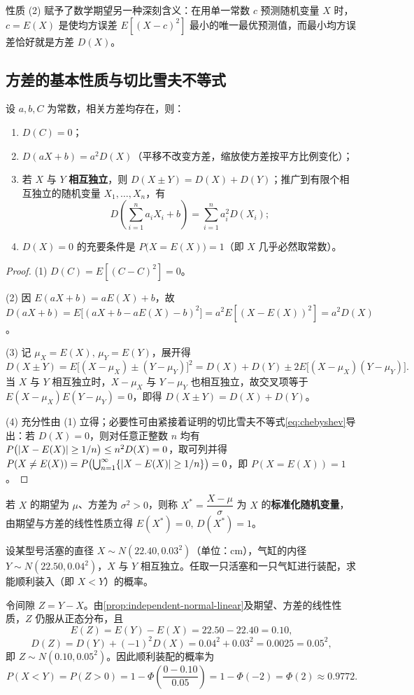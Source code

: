 性质 (2) 赋予了数学期望另一种深刻含义：在用单一常数 $c$ 预测随机变量 $X$ 时，$c=E(X)$ 是使均方误差 $E[(X-c)^2]$ 最小的唯一最优预测值，而最小均方误差恰好就是方差 $D(X)$。

\subsection{方差的基本性质与切比雪夫不等式}

\begin{proposition}[方差的基本性质]
\label{prop:variance-properties}
设 $a,b,C$ 为常数，相关方差均存在，则：
\begin{enumerate}
  \item $D(C)=0$；
  \item $D(aX+b)=a^2 D(X)$（平移不改变方差，缩放使方差按平方比例变化）；
  \item 若 $X$ 与 $Y$ \textbf{相互独立}，则 $D(X\pm Y)=D(X)+D(Y)$；推广到有限个相互独立的随机变量 $X_1,\ldots,X_n$，有
  \[
    D\!\left(\sum_{i=1}^{n}a_i X_i+b\right)=\sum_{i=1}^{n}a_i^2 D(X_i);
  \]
  \item $D(X)=0$ 的充要条件是 $P\bigl(X=E(X)\bigr)=1$（即 $X$ 几乎必然取常数）。
\end{enumerate}
\end{proposition}
\begin{proof}
(1) $D(C)=E[(C-C)^2]=0$。

(2) 因 $E(aX+b)=aE(X)+b$，故 $D(aX+b)=E\bigl[(aX+b-aE(X)-b)^2\bigr]=a^2 E[(X-E(X))^2]=a^2 D(X)$。

(3) 记 $\mu_X=E(X),\,\mu_Y=E(Y)$，展开得
\[
  D(X\pm Y)=E\bigl[(X-\mu_X)\pm(Y-\mu_Y)\bigr]^2
  =D(X)+D(Y)\pm 2E\bigl[(X-\mu_X)(Y-\mu_Y)\bigr].
\]
当 $X$ 与 $Y$ 相互独立时，$X-\mu_X$ 与 $Y-\mu_Y$ 也相互独立，故交叉项等于 $E(X-\mu_X)E(Y-\mu_Y)=0$，即得 $D(X\pm Y)=D(X)+D(Y)$。

(4) 充分性由 (1) 立得；必要性可由紧接着证明的切比雪夫不等式\eqref{eq:chebyshev}导出：若 $D(X)=0$，则对任意正整数 $n$ 均有 $P\bigl(\lvert X-E(X)\rvert\ge 1/n\bigr)\le n^2 D(X)=0$，取可列并得 $P(X\ne E(X))=P\bigl(\bigcup_{n=1}^{\infty}\{\lvert X-E(X)\rvert\ge 1/n\}\bigr)=0$，即 $P(X=E(X))=1$。
\end{proof}

若 $X$ 的期望为 $\mu$、方差为 $\sigma^2>0$，则称 $X^*=\dfrac{X-\mu}{\sigma}$ 为 $X$ 的\textbf{标准化随机变量}，由期望与方差的线性性质立得 $E(X^*)=0,\,D(X^*)=1$。

\begin{example}[title={活塞与气缸的装配概率}]
\label{eg:piston-assembly}
设某型号活塞的直径 $X\sim N(22.40,0.03^2)$（单位：$\mathrm{cm}$），气缸的内径 $Y\sim N(22.50,0.04^2)$，$X$ 与 $Y$ 相互独立。任取一只活塞和一只气缸进行装配，求能顺利装入（即 $X<Y$）的概率。
\begin{solution}
令间隙 $Z=Y-X$。由\cref{prop:independent-normal-linear}及期望、方差的线性性质，$Z$ 仍服从正态分布，且
\[
  E(Z)=E(Y)-E(X)=22.50-22.40=0.10,
\]
\[
  D(Z)=D(Y)+(-1)^2 D(X)=0.04^2+0.03^2=0.0025=0.05^2,
\]
即 $Z\sim N(0.10,0.05^2)$。因此顺利装配的概率为
\[
  P(X<Y)=P(Z>0)=1-\Phi\!\left(\frac{0-0.10}{0.05}\right)=1-\Phi(-2)=\Phi(2)\approx 0.9772.
\]
\end{solution}
\end{example}

